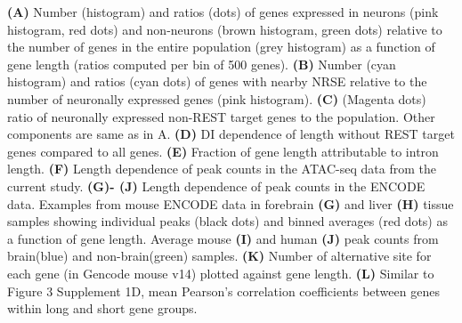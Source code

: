 \textbf{(A)} Number (histogram) and ratios (dots) of genes expressed in neurons (pink histogram, red dots) and non-neurons (brown histogram, green dots) relative to the number of genes in the entire population (grey histogram) as a function of gene length (ratios computed per bin of 500 genes). 
\textbf{(B)} Number (cyan histogram) and ratios (cyan dots) of genes with nearby NRSE relative to the number of neuronally expressed genes (pink histogram). 
\textbf{(C)} (Magenta dots) ratio of neuronally expressed non-REST target genes to the population. Other components are same as in A.
\textbf{(D)} DI dependence of length without REST target genes compared to all genes.
\textbf{(E)} Fraction of gene length attributable to intron length.
\textbf{(F)} Length dependence of peak counts in the ATAC-seq data from the current study.
\textbf{(G)- (J)} Length dependence of peak counts in the ENCODE data. Examples from mouse ENCODE data in forebrain \textbf{(G)} and liver \textbf{(H)} tissue samples showing individual peaks (black dots) and binned averages (red dots) as a function of gene length. Average mouse \textbf{(I)} and human \textbf{(J)} peak counts from brain(blue) and non-brain(green) samples.
\textbf{(K)} Number of alternative site for each gene (in Gencode mouse v14) plotted against gene length.
\textbf{(L)} Similar to Figure 3 Supplement 1D, mean Pearson's correlation coefficients between genes within long and short gene groups.




